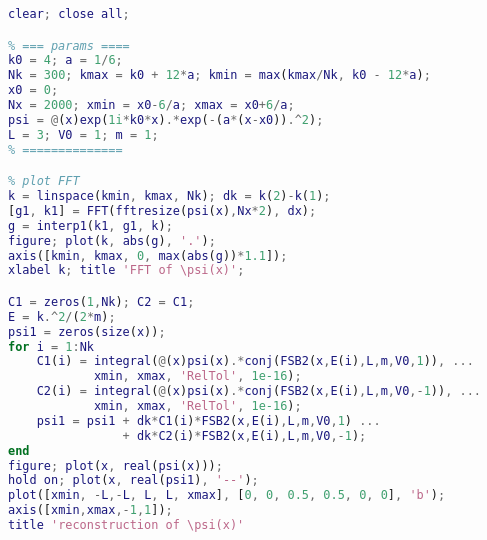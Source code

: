 \begin{lstlisting}[language=matlab]
% 使用类 exp(ikx), exp(-ikx) 基底
clear; close all;

% === params ====
k0 = 4; a = 1/6;
Nk = 300; kmax = k0 + 12*a; kmin = max(kmax/Nk, k0 - 12*a);
x0 = 0;
Nx = 2000; xmin = x0-6/a; xmax = x0+6/a;
psi = @(x)exp(1i*k0*x).*exp(-(a*(x-x0)).^2);
L = 3; V0 = 1; m = 1;
% ==============

% plot FFT
k = linspace(kmin, kmax, Nk); dk = k(2)-k(1);
[g1, k1] = FFT(fftresize(psi(x),Nx*2), dx);
g = interp1(k1, g1, k);
figure; plot(k, abs(g), '.');
axis([kmin, kmax, 0, max(abs(g))*1.1]);
xlabel k; title 'FFT of \psi(x)';

C1 = zeros(1,Nk); C2 = C1;
E = k.^2/(2*m);
psi1 = zeros(size(x));
for i = 1:Nk
    C1(i) = integral(@(x)psi(x).*conj(FSB2(x,E(i),L,m,V0,1)), ...
            xmin, xmax, 'RelTol', 1e-16);
    C2(i) = integral(@(x)psi(x).*conj(FSB2(x,E(i),L,m,V0,-1)), ...
            xmin, xmax, 'RelTol', 1e-16);
    psi1 = psi1 + dk*C1(i)*FSB2(x,E(i),L,m,V0,1) ...
                + dk*C2(i)*FSB2(x,E(i),L,m,V0,-1);
end
figure; plot(x, real(psi(x)));
hold on; plot(x, real(psi1), '--');
plot([xmin, -L,-L, L, L, xmax], [0, 0, 0.5, 0.5, 0, 0], 'b');
axis([xmin,xmax,-1,1]);
title 'reconstruction of \psi(x)'
\end{lstlisting}

